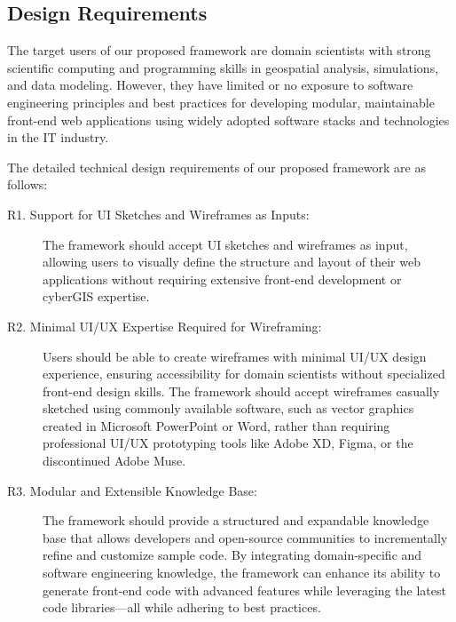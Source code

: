 \subsection{Design Requirements}
\label{subsec:DesignRequire}
The target users of our proposed framework are domain scientists with strong scientific computing and programming skills in geospatial analysis, simulations, and data modeling. However, they have limited or no exposure to software engineering principles and best practices for developing modular, maintainable front-end web applications using widely adopted software stacks and technologies in the IT industry.

The detailed technical design requirements of our proposed framework are as follows:
\begin{description}
    \item[R1. Support for UI Sketches and Wireframes as Inputs:]  
    The framework should accept UI sketches and wireframes as input, allowing users to visually define the structure and layout of their web applications without requiring extensive front-end development or cyberGIS expertise.
    
    \item[R2. Minimal UI/UX Expertise Required for Wireframing:]  
    Users should be able to create wireframes with minimal UI/UX design experience, ensuring accessibility for domain scientists without specialized front-end design skills. The framework should accept wireframes casually sketched using commonly available software, such as vector graphics created in Microsoft PowerPoint or Word, rather than requiring professional UI/UX prototyping tools like Adobe XD, Figma, or the discontinued Adobe Muse.
    
    \item[R3. Modular and Extensible Knowledge Base:]  
    The framework should provide a structured and expandable knowledge base that allows developers and open-source communities to incrementally refine and customize sample code. By integrating domain-specific and software engineering knowledge, the framework can enhance its ability to generate front-end code with advanced features while leveraging the latest code libraries—all while adhering to best practices.
    

\end{description}
